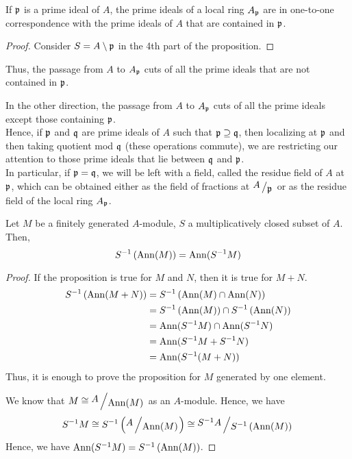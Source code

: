 \begin{corollary}{}{}
	If \(\mathfrak{p}\) is a prime ideal of \(A\), the prime ideals of a local ring
	\(A_{\mathfrak{p}}\) are in one-to-one correspondence with the prime ideals of
	\(A\) that are contained in \(\mathfrak{p}\).
\end{corollary}
\begin{proof}
	Consider \(S = A \setminus \mathfrak{p}\) in the 4th part of the proposition.
\end{proof}

\begin{note}
	Thus, the passage from \(A\) to \(A_{\mathfrak{p}}\) cuts of all
	the prime ideals that are not contained in \(\mathfrak{p}\).

	In the other direction, the passage from \(A\) to \(A_{\mathfrak{p}}\) cuts
	of all the prime ideals except those containing \(\mathfrak{p}\). \\

	Hence, if \(\mathfrak{p}\) and \(\mathfrak{q}\) are prime ideals of \(A\) such that
	\(\mathfrak{p} \supseteq \mathfrak{q}\), then localizing at \(\mathfrak{p}\) and then
	taking quotient mod \(\mathfrak{q}\) (these operations commute), we are
	restricting our attention to those prime ideals that
	lie between \(\mathfrak{q}\) and \(\mathfrak{p}\). \\

	In particular, if \(\mathfrak{p} = \mathfrak{q}\), we will be left with a field,
	called the residue field of \(A\) at \(\mathfrak{p}\), which can be obtained
	either as the field of fractions at \(\bigslant{A}{\mfp}\) or as
	the residue field of the local ring \(A_{\mathfrak{p}}\).
\end{note}


\begin{proposition}{}{}
	Let \(M\) be a finitely generated \(A\)-module, \(S\) a multiplicatively
	closed subset of \(A\).
	Then,
	\[
		S^{-1} \left( \operatorname{Ann}(M) \right) = \operatorname{Ann}(S^{-1}M)
	\]
\end{proposition}
\begin{proof}
	If the proposition is true for \(M\) and \(N\), then it is true for
	\(M + N\).
	\begin{align*}
		S^{-1} \left( \operatorname{Ann}(M + N) \right) &= S^{-1} \left( \operatorname{Ann}(M) \cap \operatorname{Ann}(N) \right) \\
		&= S^{-1} \left( \operatorname{Ann}(M) \right) \cap S^{-1} \left( \operatorname{Ann}(N) \right) \\
		&= \operatorname{Ann}(S^{-1}M) \cap \operatorname{Ann}(S^{-1}N) \\
		&= \operatorname{Ann}(S^{-1}M + S^{-1}N) \\
		&= \operatorname{Ann}(S^{-1}(M + N))
	\end{align*}
	Thus, it is enough to prove the proposition for \(M\) generated by
	one element.

	We know that \(M \cong \bigslant{A}{\Ann(M)}\) as an \(A\)-module.
	Hence, we have
	\[
		S^{-1}M \cong S^{-1} \brak{\bigslant{A}{\Ann(M)}}
		\cong \bigslant{S^{-1}A}{S^{-1} \brak{\Ann(M)}}
	\]
	Hence, we have \(\operatorname{Ann}(S^{-1}M) = S^{-1} \left( \operatorname{Ann}(M) \right)\).
\end{proof}


